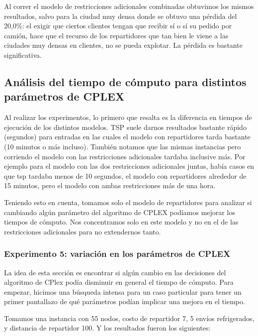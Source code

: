 \documentclass{article}
\begin{document}
    Al correr el modelo de restricciones adicionales combinadas obtuvimos los mismos resultados, salvo para la ciudad muy densa donde se obtuvo una pérdida del 20,0\%: el exigir que ciertos clientes tengan que recibir sí o sí su pedido por camión, hace que el recurso de los repartidores que tan bien le viene a las ciudades muy densas en clientes, no se pueda explotar. La pérdida es bastante significativa.

    \subsection{Análisis del tiempo de cómputo para distintos parámetros de CPLEX}

    Al realizar los experimentos, lo primero que resalta es la diferencia en tiempos de ejecución de los distintos modelos. TSP suele darnos resultados bastante rápido (segundos) para entradas en las cuales el modelo con repartidores tarda bastante (10 minutos o más incluso). También notamos que las mismas instancias pero corriendo el modelo con las restricciones adicionales tardaba inclusive más. Por ejemplo para el modelo con las dos restricciones adicionales juntas, había casos en que tsp tardaba menos de 10 segundos, el modelo con repartidores alrededor de 15 minutos, pero el modelo con ambas restricciones más de una hora.

    Teniendo esto en cuenta, tomamos solo el modelo de repartidores para analizar si cambiando algún parámetro del algoritmo de CPLEX podíamos mejorar los tiempos de cómputo. Nos concentramos solo en este modelo y no en el de las restricciones adicionales para no extendernos tanto.


    \subsubsection{Experimento 5: variación en los parámetros de CPLEX}
    La idea de esta sección es encontrar si algún cambio en las decisiones del algoritmo de CPlex podía disminuir en general el tiempo de cómputo. Para empezar, hicimos una búsqueda intensa para un caso particular para tener un primer pantallazo de qué parámetros podían implicar una mejora en el tiempo.

    Tomamos una instancia con 55 nodos, costo de repartidor 7, 5 envíos refrigerados, y distancia de repartidor 100. Y los resultados fueron los siguientes:
\end{document}
